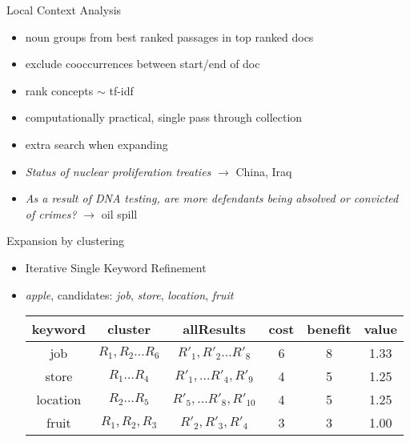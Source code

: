 \begin{frame}{Local Context Analysis}
  \begin{itemize}
    \item noun groups from best ranked passages in top ranked docs
    \item exclude cooccurrences between start/end of doc
    \item rank concepts $\sim$ tf-idf
    \item computationally practical, single pass through collection
    \item extra search when expanding
    \item \textit{Status of nuclear proliferation treaties} $\rightarrow$ China, Iraq
    \pause \item \textit{As a result of DNA testing, are more defendants being absolved or convicted of crimes?} $\rightarrow$ oil spill
  \end{itemize}
\end{frame}

\begin{frame}{Expansion by clustering}
  \begin{itemize}
    \item Iterative Single Keyword Refinement
    \item \textit{apple}, candidates: \textit{job}, \textit{store}, \textit{location}, \textit{fruit}
    \begin{table}[h]
      \begin{tabular}{|c|c|c|c|c|c|}
        \hline
        keyword & cluster & allResults & cost & benefit & value \\\hline\hline
        job & $R_1, R_2 \ldots R_6$ & $R'_1, R'_2 \ldots R'_8$ & 6 & 8 & 1.33 \\\hline
        store & $R_1 \ldots R_4$ & $R'_1, \ldots R'_4, R'_9$ & 4 & 5 & 1.25 \\\hline
        location & $R_2 \ldots R_5$ & $R'_5, \ldots R'_8, R'_{10}$ & 4 & 5 & 1.25 \\\hline
        fruit & $R_1, R_2, R_3$ & $R'_2, R'_3, R'_4$ & 3 & 3 & 1.00 \\\hline
      \end{tabular}
    \end{table}
  \end{itemize}
\end{frame}

